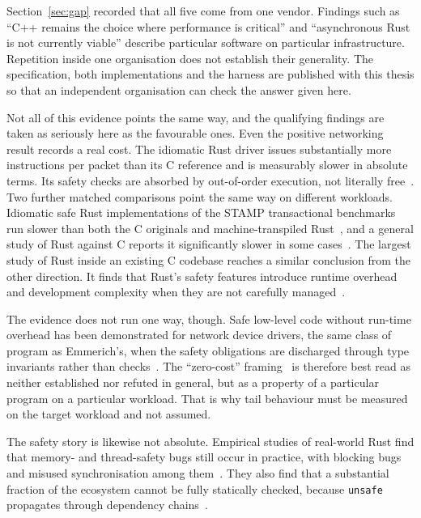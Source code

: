 \documentclass[english,oneside,a4paper,censored,csm,software-track-2020]{HYthesisML}
\begin{document}
Section~\ref{sec:gap} recorded that all five come from one vendor. Findings such as ``C++ remains
the choice where performance is critical'' and ``asynchronous Rust is not currently viable''
describe particular software on particular infrastructure. Repetition inside one organisation
does not establish their generality. The specification, both implementations and the harness
are published with this thesis so that an independent organisation can check the answer given here.

Not all of this evidence points the same way, and the qualifying findings are taken as seriously
here as the favourable ones. Even the positive networking result records a real cost. The idiomatic Rust driver issues
substantially more instructions per packet than its C reference and is measurably slower in
absolute terms. Its safety checks are absorbed by out-of-order execution, not
literally free~\cite{emmerich2019drivers}. Two further matched comparisons point the same way on
different workloads. Idiomatic safe Rust implementations of the STAMP transactional benchmarks run
slower than both the C originals and machine-transpiled Rust~\cite{suchert2023stamp}, and a
general study of Rust against C reports it significantly slower in some
cases~\cite{okawa2024ruststudy}. The largest study of Rust inside an existing C codebase reaches a
similar conclusion from the other direction. It finds that Rust's safety features introduce
runtime overhead and development complexity when they are not carefully
managed~\cite{li2026rustlinux}.

The evidence does not run one way, though. Safe low-level code without run-time overhead has
been demonstrated for network device drivers, the same class of program as Emmerich's, when the
safety obligations are discharged through type invariants rather than checks~\cite{pirelli2023safelowlevel}.
The ``zero-cost'' framing~\cite{balasubramanian2017rust} is therefore best read as neither
established nor refuted in general, but as a property of a particular program on a particular
workload. That is why tail behaviour must be measured on the target workload and not assumed.

The safety story is likewise not absolute. Empirical studies of real-world Rust find that memory-
and thread-safety bugs still occur in practice, with blocking bugs and misused synchronisation
among them~\cite{qin2020rust,qin2024safety}. They also find that a substantial fraction of the
ecosystem cannot be fully statically checked, because \texttt{unsafe} propagates through
dependency chains~\cite{evans2020rust}.
\end{document}
